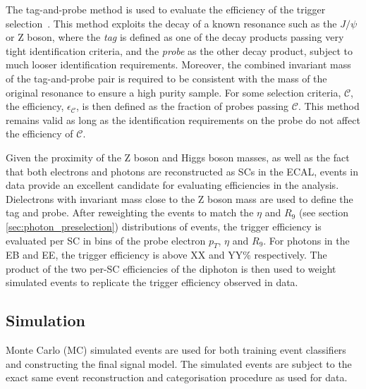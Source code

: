 The tag-and-probe method is used to evaluate the efficiency of the trigger selection~\cite{CMS:2011aa}. This method exploits the decay of a known resonance such as the $J/\psi$ or Z boson, where the \textit{tag} is defined as one of the decay products passing very tight identification criteria, and the \textit{probe} as the other decay product, subject to much looser identification requirements. Moreover, the combined invariant mass of the tag-and-probe pair is required to be consistent with the mass of the original resonance to ensure a high purity sample. For some selection criteria, $\mathcal{C}$, the efficiency, $\epsilon_{\mathcal{C}}$, is then defined as the fraction of probes passing $\mathcal{C}$. This method remains valid as long as the identification requirements on the probe do not affect the efficiency of $\mathcal{C}$.

Given the proximity of the Z boson and Higgs boson masses, as well as the fact that both electrons and photons are reconstructed as SCs in the ECAL, \Zee events in data provide an excellent candidate for evaluating efficiencies in the \Hgg analysis. Dielectrons with invariant mass close to the Z boson mass are used to define the tag and probe. After reweighting the \Zee events to match the $\eta$ and $R_9$ (see section \ref{sec:photon_preselection}) distributions of \Hgg events, the trigger efficiency is evaluated per SC in bins of the probe electron $p_T$, $\eta$ and $R_9$. For photons in the EB and EE, the trigger efficiency is above XX and YY\% respectively. The product of the two per-SC efficiencies of the diphoton is then used to weight simulated events to replicate the trigger efficiency observed in data.

\subsection{Simulation}\label{sec:hgg_simulation}
Monte Carlo (MC) simulated events are used for both training event classifiers and constructing the final signal model. The simulated events are subject to the exact same event reconstruction and categorisation procedure as used for data. 

